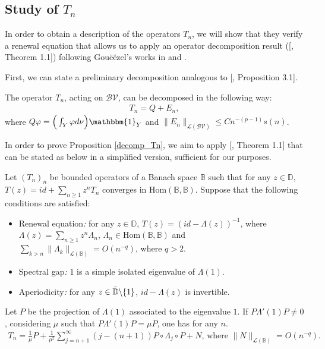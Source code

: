 \documentclass{ws-sd}
\newcommand{\indic}{\mathbbm{1}}
\begin{document}
\subsection{Study of \texorpdfstring{$T_n$}{}}
    \label{section:decomp_Tn}

In order to obtain a description of the operators $T_n$, we will show that they verify a renewal equation that allows us to apply an operator decomposition result ([, Theorem 1.1]) following Gouë\"ezel's works in \cite{14} and \cite{15}.

First, we can state a preliminary decomposition analogous to [, Proposition 3.1].
\begin{proposition}\label{decomp_Tn}
    The operator $T_n$, acting on $\mathcal{BV}$, can be decomposed in the following way:
    \begin{align*}
        T_n = Q + E_n,
    \end{align*}
    where  $Q\varphi = \Big( \int_{Y} \varphi d\nu \Big) \indic_{Y}$ and $ \lVert E_n \rVert_{\mathcal L(\mathcal{BV})}\le Cn^{-(p-1)}s(n)$.
\end{proposition}
In order to prove Proposition \ref{decomp_Tn}, we aim to apply [, Theorem 1.1] that can be stated as below in a simplified version, sufficient for our purposes.
\begin{theorem}\label{Theorem_renewal}
    Let $(T_n)_n$ be bounded operators of a Banach space $\mathbb{B}$ such that for any $z \in \mathbb{D}$, $T(z) = id + \sum_{n \ge 1} z^n T_n$ converges in $\text{Hom}(\mathbb{B},\mathbb{B})$. Suppose that the following conditions are satisfied:
    \begin{itemize}
        \item Renewal equation\emph{:} for any $z \in \mathbb{D}$, $T(z) = (id-\Lambda(z))^{-1}$, where $\Lambda(z) = \sum_{n\ge 1} z^n \Lambda_n$, $\Lambda_n \in \text{Hom}(\mathbb{B},\mathbb{B}) $ and $\sum_{k>n} \lVert \Lambda_k \rVert_{\mathcal{L}(\mathbb{B})} = O(n^{-q})$, where $q > 2$.
        \item Spectral gap\emph{:} $1$ is a simple isolated eigenvalue of $\Lambda(1)$.
        \item Aperiodicity\emph{:} for any $z \in \Bar{\mathbb{D}}\backslash \{1 \}$, $id-\Lambda(z)$ is invertible.
    \end{itemize}
    Let $P$ be the projection of $\Lambda(1)$ associated to the eigenvalue $1$. If $P\Lambda'(1)P\neq 0$, considering $\mu$ such that $P\Lambda'(1)P = \mu P$, one has for any $n$.
    \begin{align*}
        T_n = \frac{1}{\mu}P + \frac{1}{\mu^2}\sum_{j = n+1}^\infty(j-(n+1))P\circ \Lambda_j \circ P + N  \text{, where } \lVert N \rVert_{\mathcal L(\mathbb{B})} = O(n^{-q}).
    \end{align*}
\end{theorem}
\end{document}
